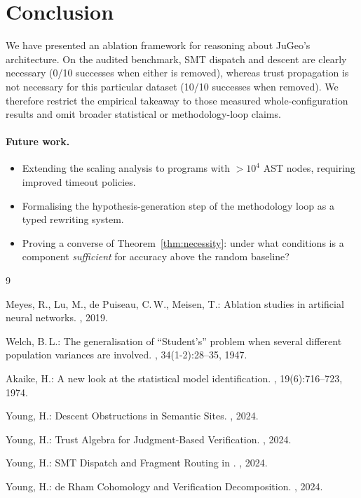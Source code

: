 \documentclass[11pt]{article}
\begin{document}
\section{Conclusion}
\label{sec:conclusion}

We have presented an ablation framework for reasoning about JuGeo's
architecture.  On the audited benchmark, SMT dispatch and descent are
clearly necessary (0/10 successes when either is removed), whereas trust
propagation is not necessary for this particular dataset (10/10
successes when removed).  We therefore restrict the empirical takeaway
to those measured whole-configuration results and omit broader
statistical or methodology-loop claims.

\paragraph{Future work.}
\begin{itemize}
\item Extending the scaling analysis to programs with $> 10^4$ AST
  nodes, requiring improved timeout policies.
\item Formalising the hypothesis-generation step of the methodology
  loop as a typed rewriting system.
\item Proving a converse of Theorem~\ref{thm:necessity}: under what
  conditions is a component \emph{sufficient} for accuracy above the
  random baseline?
\end{itemize}

\begin{thebibliography}{9}

Meyes, R., Lu, M., de Puiseau, C.\,W., Meisen, T.:
\newblock Ablation studies in artificial neural networks.
, 2019.

Welch, B.\,L.:
\newblock The generalisation of ``Student's'' problem when several
  different population variances are involved.
, 34(1-2):28--35, 1947.

Akaike, H.:
\newblock A new look at the statistical model identification.
, 19(6):716--723, 1974.

Young, H.:
\newblock Descent Obstructions in Semantic Sites.
, 2024.

Young, H.:
\newblock Trust Algebra for Judgment-Based Verification.
, 2024.

Young, H.:
\newblock SMT Dispatch and Fragment Routing in \JuGeo.
, 2024.

Young, H.:
\newblock de Rham Cohomology and Verification Decomposition.
, 2024.

\end{thebibliography}
\end{document}
